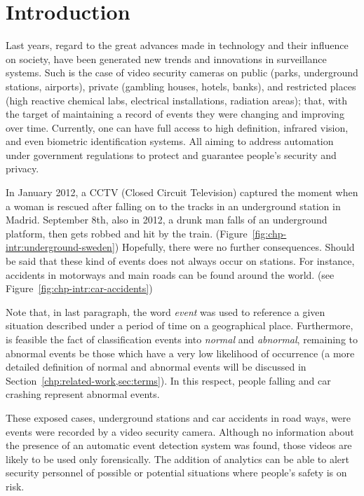 \chapter{Introduction}
\label{chp:introduction}
Last years, regard to the great advances made in technology and their
influence on society, have been generated new trends and innovations in
surveillance systems. Such is the case of video security cameras on public
(parks, underground stations, airports), private (gambling houses, hotels,
banks), and restricted places (high reactive chemical labs, electrical
installations, radiation areas); that, with the target of maintaining a record
of events they were changing and improving over time. Currently, one can
have full access to high definition, infrared vision, and even biometric
identification systems. All aiming to address automation under government
regulations to protect and guarantee people's security and privacy.

In January 2012, a CCTV (Closed Circuit Television) captured the moment when a
woman is rescued after falling on to the tracks in an underground station in
Madrid. September 8th, also in 2012, a drunk man falls of an underground
platform, then gets robbed and hit by the train.
(Figure~\ref{fig:chp-intr:underground-sweden}) Hopefully, there were no further
consequences. Should be said that these kind of events does not always occur on
stations. For instance, accidents in motorways and main roads can be found
around the world. (see Figure~\ref{fig:chp-intr:car-accidents}) 

Note that, in last paragraph, the word \textit{event} was used to reference a
given situation described under a period of time on a geographical place.
Furthermore, is feasible the fact of classification events into
\textit{normal} and \textit{abnormal}, remaining to abnormal events be those
which have a very low likelihood of occurrence (a more detailed definition
of normal and abnormal events will be discussed in
Section~\ref{chp:related-work,sec:terms}). In this respect, people falling and
car crashing represent abnormal events.

These exposed cases, underground stations and car accidents in road ways, were
events were recorded by a video security camera. Although no information about
the presence of an automatic event detection system was found, those videos are
likely to be used only forensically. The addition of analytics can be able
to alert security personnel of possible or potential situations where people's
safety is on risk.

